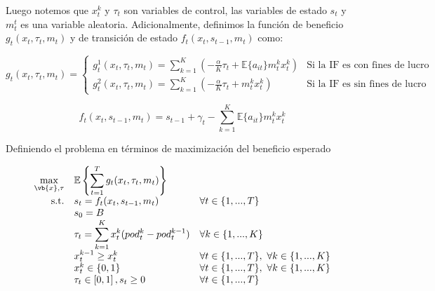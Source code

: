 Luego notemos que $x_{t}^{k}$ y $\tau_t$ son variables de control, las variables de estado $s_t$ y $m_{t}^{t}$ es una variable aleatoria. Adicionalmente, definimos la función de beneficio $g_t(x_t,\tau_t, m_t)$ y de transición de estado $f_t(x_t, s_{t-1},m_{t})$ como:


\[ g_t(x_t,\tau_t, m_t)  = \begin{cases} g_t^1(x_t,\tau_t,m_t) = \sum_{k=1}^{K}\left(- \frac{\alpha}{K}\tau_t +  \mathbb{E}\{a_{it}\} m_{t}^{k} x_{t}^{k}\right) & \text{Si la IF es con fines de lucro} \\ g_t^2(x_t,\tau_t, m_t) = \sum_{k=1}^{K}\left(- \frac{\alpha}{K}\tau_t +  m_{t}^{k} x_{t}^{k}\right) & \text{Si la IF es sin fines de lucro} \end{cases} \] 
 
$$f_t(x_t,s_{t-1},m_t)= s_{t-1} + \gamma_t - \displaystyle\sum_{k=1}^{K}\mathbb{E}\{a_{it}\} m_{t}^{k} x_{t}^{k}$$

Definiendo el problema en términos de maximización del beneficio esperado

$$ \begin{array}{r l l}
	\displaystyle\max_{\vb{x}, \tau} & \mathbb{E} \left\lbrace \displaystyle\sum_{t=1}^{T} g_t(x_t,\tau_t, m_t) \right\rbrace &   									\\
	\text{s.t.}&  s_{t} = f_t(x_t,s_{t-1},m_t)	& \forall t \in \{1,...,T\}		\\
					&  s_{0} = B &                                                                                   	\\
					& \tau_{t} = \displaystyle\sum_{k=1}^{K} x_{t}^{k}({pod_{t}^k - pod_{t}^{k-1}}) & \forall k \in \{1,...,K\}                 \\
					
					& x_{t}^{k-1} \geq x_{t}^{k} & \forall t \in \{1,...,T\}  , \text{  } \forall k \in \{1,...,K\} \\
					
					& x_{t}^k \in \{0, 1\} & \forall t \in \{1,...,T\}  , \text{  } \forall k \in \{1,...,K\} \\                                      
					& \tau_{t} \in \left[0,1 \right] , s_{t} \geq 0 & \forall t \in \{1,...,T\}                \\
					
\end{array} $$




